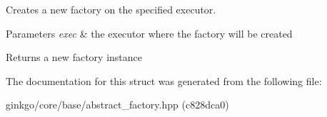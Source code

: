 Creates a new factory on the specified executor. 


\begin{DoxyParams}{Parameters}
{\em exec} & the executor where the factory will be created\\
\hline
\end{DoxyParams}
\begin{DoxyReturn}{Returns}
a new factory instance 
\end{DoxyReturn}


The documentation for this struct was generated from the following file\+:\begin{DoxyCompactItemize}
\item 
ginkgo/core/base/abstract\+\_\+factory.\+hpp (c828dca0)\end{DoxyCompactItemize}
